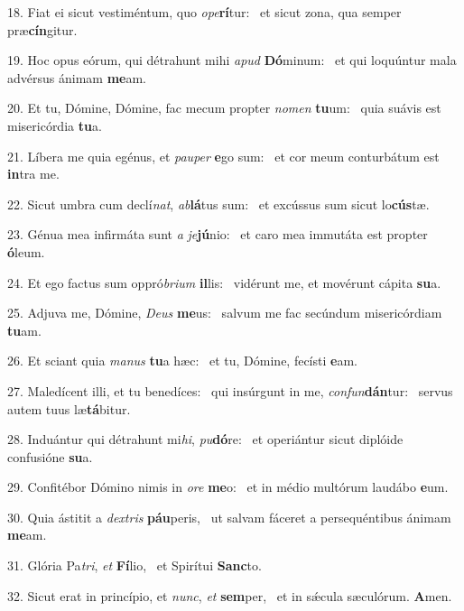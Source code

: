 18. Fiat ei sicut vestiméntum, quo \textit{o}\textit{pe}\textbf{rí}tur: \ast\  et sicut zona, qua semper præ\textbf{cín}gitur.\

19. Hoc opus eórum, qui détrahunt mihi \textit{a}\textit{pud} \textbf{Dó}minum: \ast\  et qui loquúntur mala advérsus ánimam \textbf{me}am.\

20. Et tu, Dómine, Dómine, fac mecum propter \textit{no}\textit{men} \textbf{tu}um: \ast\  quia suávis est misericórdia \textbf{tu}a.\

21. Líbera me quia egénus, et \textit{pau}\textit{per} \textbf{e}go sum: \ast\  et cor meum conturbátum est \textbf{in}tra me.\

22. Sicut umbra cum declí\textit{nat}, \textit{ab}\textbf{lá}tus sum: \ast\  et excússus sum sicut lo\textbf{cús}tæ.\

23. Génua mea infirmáta sunt \textit{a} \textit{je}\textbf{jú}nio: \ast\  et caro mea immutáta est propter \textbf{ó}leum.\

24. Et ego factus sum oppró\textit{bri}\textit{um} \textbf{il}lis: \ast\  vidérunt me, et movérunt cápita \textbf{su}a.\

25. Adjuva me, Dómine, \textit{De}\textit{us} \textbf{me}us: \ast\  salvum me fac secúndum misericórdiam \textbf{tu}am.\

26. Et sciant quia \textit{ma}\textit{nus} \textbf{tu}a hæc: \ast\  et tu, Dómine, fecísti \textbf{e}am.\

27. Maledícent illi, et tu benedíces: \dag\  qui insúrgunt in me, \textit{con}\textit{fun}\textbf{dán}tur: \ast\  servus autem tuus læ\textbf{tá}bitur.\

28. Induántur qui détrahunt mi\textit{hi}, \textit{pu}\textbf{dó}re: \ast\  et operiántur sicut diplóide confusióne \textbf{su}a.\

29. Confitébor Dómino nimis in \textit{o}\textit{re} \textbf{me}o: \ast\  et in médio multórum laudábo \textbf{e}um.\

30. Quia ástitit a \textit{dex}\textit{tris} \textbf{páu}peris, \ast\  ut salvam fáceret a persequéntibus ánimam \textbf{me}am.\

31. Glória Pa\textit{tri}, \textit{et} \textbf{Fí}lio, \ast\  et Spirítui \textbf{Sanc}to.\

32. Sicut erat in princípio, et \textit{nunc}, \textit{et} \textbf{sem}per, \ast\  et in sǽcula sæculórum. \textbf{A}men.\

